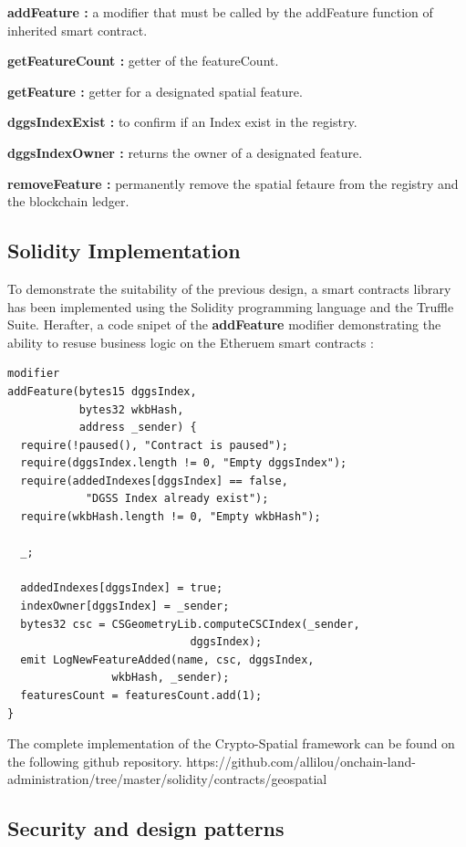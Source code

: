 \documentclass{isprs} %
\begin{document}
\textbf{addFeature :} a modifier that must be called by the addFeature function of inherited smart contract.

\textbf{getFeatureCount :} getter of the featureCount.

\textbf{getFeature :} getter for a designated spatial feature.

\textbf{dggsIndexExist :} to confirm if an Index exist in the registry.

\textbf{dggsIndexOwner :} returns the owner of a designated feature.

\textbf{removeFeature :} permanently remove the spatial fetaure from the registry and the blockchain ledger.

\subsection{Solidity Implementation}\label{sec:Solidity Implementation}

To demonstrate the suitability of the previous design, a smart contracts library has been implemented using the Solidity programming language and the Truffle Suite. Herafter, a code snipet of the \textbf{addFeature} modifier demonstrating the ability to resuse business logic on the Etheruem smart contracts :

\begin{verbatim}
modifier 
addFeature(bytes15 dggsIndex, 
		   bytes32 wkbHash, 
		   address _sender) {
  require(!paused(), "Contract is paused");
  require(dggsIndex.length != 0, "Empty dggsIndex");
  require(addedIndexes[dggsIndex] == false, 
  			"DGSS Index already exist");
  require(wkbHash.length != 0, "Empty wkbHash");

  _;

  addedIndexes[dggsIndex] = true;
  indexOwner[dggsIndex] = _sender;
  bytes32 csc = CSGeometryLib.computeCSCIndex(_sender, 
  							dggsIndex); 
  emit LogNewFeatureAdded(name, csc, dggsIndex, 
  				wkbHash, _sender);
  featuresCount = featuresCount.add(1);
}
\end{verbatim}

The complete implementation of the Crypto-Spatial framework can be found on the following github repository.
https://github.com/allilou/onchain-land-administration/tree/master/solidity/contracts/geospatial

\subsection{Security and design patterns}\label{sec:Security issues and design patterns}
\end{document}
